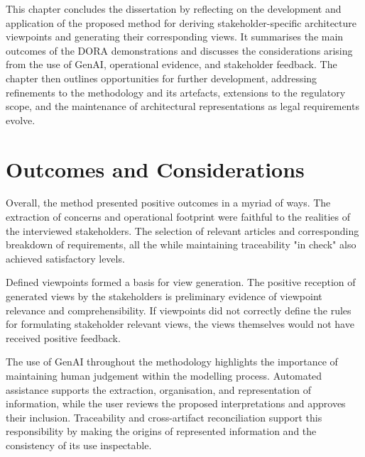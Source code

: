 \label{chap:conclusion}

This chapter concludes the dissertation by reflecting on the development and application of the proposed method for deriving stakeholder-specific architecture viewpoints and generating their corresponding views. It summarises the main outcomes of the \ac{DORA} demonstrations and discusses the considerations arising from the use of \ac{GenAI}, operational evidence, and stakeholder feedback. The chapter then outlines opportunities for further development, addressing refinements to the methodology and its artefacts, extensions to the regulatory scope, and the maintenance of architectural representations as legal requirements evolve.

\section{Outcomes and Considerations}

Overall, the method presented positive outcomes in a myriad of ways. The extraction of concerns and operational footprint were faithful to the realities of the interviewed stakeholders. The selection of relevant articles and corresponding breakdown of requirements, all the while maintaining traceability "in check" also achieved satisfactory levels.

Defined viewpoints formed a basis for view generation. The positive reception of generated views by the stakeholders is preliminary evidence of viewpoint relevance and comprehensibility. If viewpoints did not correctly define the rules for formulating stakeholder relevant views, the views themselves would not have received positive feedback.

The use of \ac{GenAI} throughout the methodology highlights the importance of maintaining human judgement within the modelling process. Automated assistance supports the extraction, organisation, and representation of information, while the user reviews the proposed interpretations and approves their inclusion. Traceability and cross-artifact reconciliation support this responsibility by making the origins of represented information and the consistency of its use inspectable.

